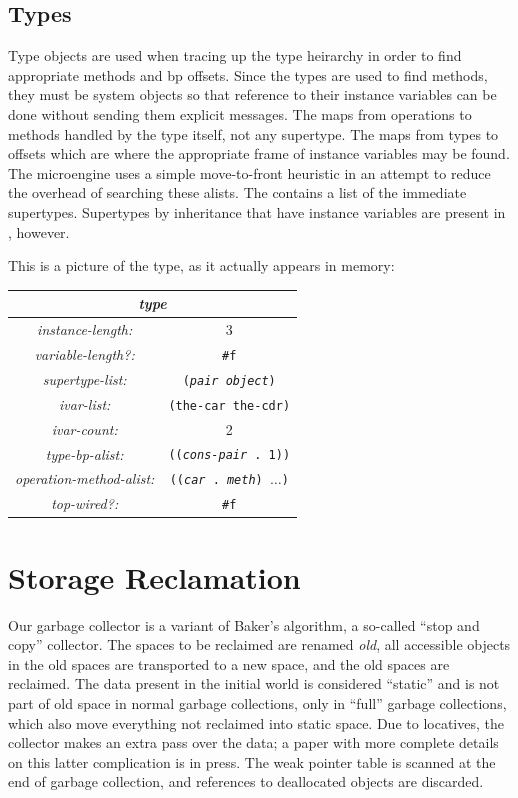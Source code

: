 \subsection{Types}

Type objects are used when tracing up the type heirarchy in order to
find appropriate methods and bp offsets.  Since the types are used to
find methods, they must be system objects so that reference to their
instance variables can be done without sending them explicit messages.
The  maps from operations to methods
handled by the type itself, not any supertype.  The 
maps from types to offsets which are where the appropriate frame of
instance variables may be found.  The microengine uses a simple
move-to-front heuristic in an attempt to reduce the overhead of
searching these alists.  The  contains a list of
the immediate supertypes.  Supertypes by inheritance that have
instance variables are present in , however.

This is a picture of the  type, as it actually appears
in memory:

\begin{center}
\begin{tabular}{|c|c|} \hline
 \multicolumn{2}{|c|}{\emph{type}} \\\hline
 \emph{instance-length:} & 3 \\\hline
 \emph{variable-length?:} & \texttt{\#f} \\\hline
 \emph{supertype-list:} & \texttt{(\emph{pair} \emph{object})}\\\hline
 \emph{ivar-list:} & \texttt{(the-car the-cdr)} \\\hline
 \emph{ivar-count:} & 2 \\\hline
 \emph{type-bp-alist:} & \texttt{((\emph{cons-pair} . 1))} \\\hline
 \emph{operation-method-alist:} & \texttt{((\emph{car} . \emph{meth}) $\ldots$)}\\\hline
 \emph{top-wired?:} & \texttt{\#f} \\\hline
\end{tabular}
\end{center}

\section{Storage Reclamation}

Our garbage collector \citep{PEARLMUTTER99} is a variant of Baker's
algorithm, a so-called ``stop and copy'' collector.  The spaces to be
reclaimed are renamed \emph{old}, all accessible objects in the old
spaces are transported to a new space, and the old spaces are
reclaimed.  The data present in the initial world is considered
``static'' and is not part of old space in normal garbage collections,
only in ``full'' garbage collections, which also move everything not
reclaimed into static space.  Due to locatives, the collector makes an
extra pass over the data; a paper with more complete details on this
latter complication is in press.  The weak pointer table is scanned at
the end of garbage collection, and references to deallocated objects
are discarded.


